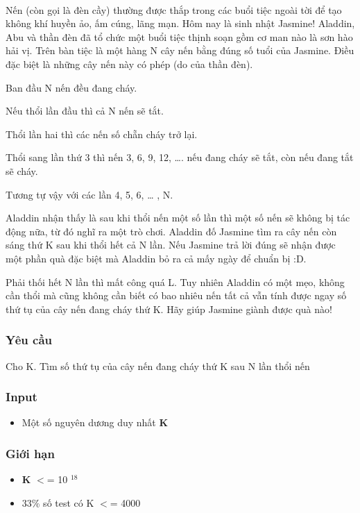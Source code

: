 

 

Nến (còn gọi là đèn cầy) thường được thắp trong các buổi tiệc ngoài tời để tạo không khí huyền ảo, ấm cúng, lãng mạn. Hôm nay là sinh nhật Jasmine! Aladdin, Abu và thần đèn đã tổ chức một buổi tiệc thịnh soạn gồm cơ man nào là sơn hào hải vị. Trên bàn tiệc là một hàng N cây nến bằng đúng số tuổi của Jasmine. Điều đặc biệt là những cây nến này có phép (do của thần đèn).

Ban đầu N nến đều đang cháy.

Nếu thổi lần đầu thì cả N nến sẽ tắt.

Thổi lần hai thì các nến số chẵn cháy trở lại.

Thổi sang lần thứ 3 thì nến 3, 6, 9, 12, …. nếu đang cháy sẽ tắt, còn nếu đang tắt sẽ cháy.

Tương tự vậy với các lần 4, 5, 6, … , N.

Aladdin nhận thấy là sau khi thổi nến một số lần thì một số nến sẽ không bị tác động nữa, từ đó nghĩ ra một trò chơi. Aladdin đố Jasmine tìm ra cây nến còn sáng thứ K sau khi thổi hết cả N lần. Nếu Jasmine trả lời đúng sẽ nhận được một phần quà đặc biệt mà Aladdin bỏ ra cả mấy ngày để chuẩn bị :D.

Phải thối hết N lần thì mất công quá L. Tuy nhiên Aladdin có một mẹo, không cần thổi mà cũng không cần biết có bao nhiêu nến tất cả vẫn tính được ngay số thứ tụ của cây nến đang cháy thứ K. Hãy giúp Jasmine giành được quà nào!

\subsubsection{Yêu cầu}

Cho K. Tìm số thứ tụ của cây nến đang cháy thứ K sau N lần thổi nến

\subsubsection{Input}
\begin{itemize}
	\item Một số nguyên dương duy nhất \textbf{ K }
\end{itemize}

\subsubsection{Giới hạn}
\begin{itemize}
	\item \textbf{K } $<$= 10 $^ 18 $
	\item 33\% số test có K $<$= 4000
\end{itemize}

